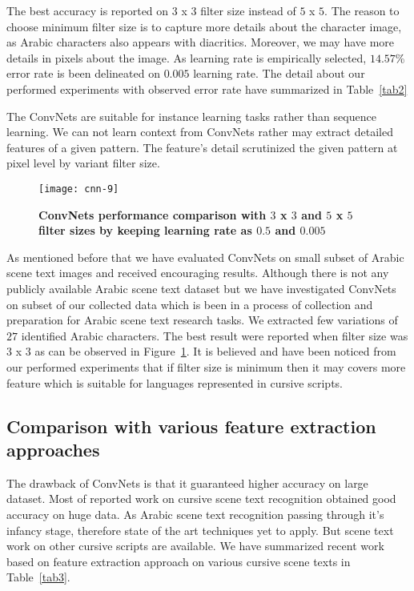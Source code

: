 \documentclass[conference]{IEEEtran}
\begin{document}
The best accuracy is reported on $3$ x $3$ filter size instead of $5$ x $5$.
The reason to choose minimum filter size is to capture more details about the character image, as Arabic characters also appears with diacritics.
Moreover, we may have more details in pixels about the image.
As learning rate is empirically selected, $14.57$\% error rate is been delineated on $0.005$ learning rate.
The detail about our performed experiments with observed error rate have summarized in Table~\ref{tab2}

The ConvNets are suitable for instance learning tasks rather than sequence learning. We can not learn context from ConvNets rather may extract detailed features of a given pattern.
The feature's detail scrutinized the given pattern at pixel level by variant filter size.

\begin{figure}[H]
\centering
\texttt{[image: cnn-9]}
\caption{\bf ConvNets performance comparison with $3$ x $3$ and $5$ x $5$ filter sizes by keeping learning rate as $0.5$ and $0.005$}
\label{graph}
\end{figure}

As mentioned before that we have evaluated ConvNets on small subset of Arabic scene text images and received encouraging results.
Although there is not any publicly available Arabic scene text dataset but we have investigated ConvNets on subset of our collected data which is been in a process of collection and preparation for Arabic scene text research tasks.
We extracted few variations of $27$ identified Arabic characters.
The best result were reported when filter size was $3$ x $3$ as can be observed in Figure~\ref{graph}.
It is believed and have been noticed from our performed experiments that if filter size is minimum then it may covers more feature which is suitable for languages represented in cursive scripts.


\subsection{Comparison with various feature extraction approaches}
The drawback of ConvNets is that it guaranteed higher accuracy on large dataset.
Most of reported work on cursive scene text recognition obtained good accuracy on huge data.
As Arabic scene text recognition passing through it's infancy stage, therefore state of the art techniques yet to apply.
But scene text work on other cursive scripts are available.
We have summarized recent work based on feature extraction approach on various cursive scene texts in Table~\ref{tab3}.
\end{document}
